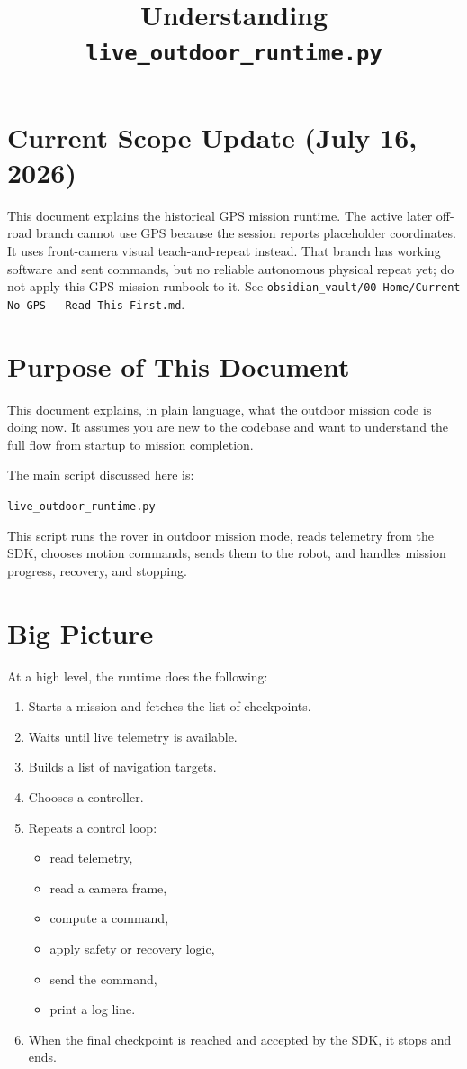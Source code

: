 \documentclass[11pt]{article}
\title{Understanding \texttt{live\_outdoor\_runtime.py}}
\author{}
\date{}
\begin{document}
\maketitle

\section*{Current Scope Update (July 16, 2026)}
This document explains the historical GPS mission runtime. The active later
off-road branch cannot use GPS because the session reports placeholder
coordinates. It uses front-camera visual teach-and-repeat instead. That branch
has working software and sent commands, but no reliable autonomous physical
repeat yet; do not apply this GPS mission runbook to it. See
\texttt{obsidian\_vault/00 Home/Current No-GPS - Read This First.md}.

\section*{Purpose of This Document}
This document explains, in plain language, what the outdoor mission code is doing now.
It assumes you are new to the codebase and want to understand the full flow from startup to mission completion.

The main script discussed here is:
\begin{center}
\texttt{live\_outdoor\_runtime.py}
\end{center}

This script runs the rover in outdoor mission mode, reads telemetry from the SDK, chooses motion commands, sends them to the robot, and handles mission progress, recovery, and stopping.

\section*{Big Picture}
At a high level, the runtime does the following:
\begin{enumerate}[leftmargin=*]
\item Starts a mission and fetches the list of checkpoints.
\item Waits until live telemetry is available.
\item Builds a list of navigation targets.
\item Chooses a controller.
\item Repeats a control loop:
\begin{itemize}[leftmargin=*]
\item read telemetry,
\item read a camera frame,
\item compute a command,
\item apply safety or recovery logic,
\item send the command,
\item print a log line.
\end{itemize}
\item When the final checkpoint is reached and accepted by the SDK, it stops and ends.
\end{enumerate}
\end{document}
